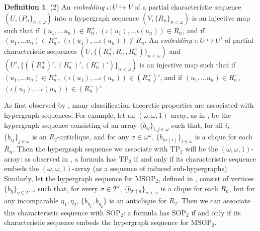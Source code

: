 \documentclass{amsart}
\theoremstyle{definition}
\newtheorem{definition}[theorem]{Definition}
\theoremstyle{remark}
\numberwithin{equation}{section}
\begin{document}
\begin{tcolorbox}
\begin{definition}
(2) An \textit{embedding} $\iota: U \hookrightarrow V$ of a partial characteristic sequence $(U, \{P_{n}\}_{n < \omega})$ into a hypergraph sequence $(V,\{R_{n}\}_{n < \omega})$ is an injective map such that if $(u_{1}, \ldots u_{n}) \in R^{+}_{n} $, $(\iota(u_{1}), \ldots \iota(u_{n})) \in R_{n} $, and if $(u_{1}, \ldots u_{n}) \in R^{-}_{n} $, $(\iota(u_{1}), \ldots \iota(u_{n})) \notin R_{n} $. An \textit{embedding} $\iota: U \hookrightarrow U'$ of partial characteristic sequences $(U, \{( R^{+}_{n} ,R_{n}^{-} ,R_{n}^{\sim})\}_{n < \omega})$ and $(U', \{( (R^{+}_{n})' ,(R_{n}^{-} )',(R_{n}^{\sim})')\}_{n < \omega})$ is an injective map such that if $(u_{1}, \ldots u_{n}) \in R^{+}_{n} $, $(\iota(u_{1}), \ldots \iota(u_{n})) \in (R^{+}_{n})' $, and if $(u_{1}, \ldots u_{n}) \in R^{-}_{n} $, $(\iota(u_{1}), \ldots \iota(u_{n})) \in (R^{-}_{n})' $

    
\end{definition}

\: As first observed by \cite{Mal10}, many classification-theoretic properties are associated with hypergraph sequences. For example, let an $(\omega, \omega, 1)$-array, as in \cite{Mal10}, be the hypergraph sequence consisting of an array $\{b_{ij}\}_{i, j \in \omega}$ such that, for all $i$, $\{b_{ij}\}_{j \in \omega}$ is an $R_{2}$-anticlique, and for any $\sigma \in \omega^{\omega}$, $\{ b_{i\sigma(i)}\}_{i \in \omega}$ is a clique for each $R_{n}$. Then the hypergraph sequence we associate with $\mathrm{TP}_{2}$ will be the $(\omega, \omega, 1)$-array: as observed in \cite{Mal10}, a formula has $\mathrm{TP}_{2}$ if and only if its characteristic sequence embeds the $(\omega, \omega, 1)$-array (as a sequence of induced sub-hypergraphs). Similarly, let the hypergraph sequence for $\mathrm{MSOP}_{2}$, defined in \cite{INDNSOP3}, consist of vertices $\{b_{\eta}\}_{\eta \in 2^{<\omega}}$ such that, for every $\sigma \in 2^{\omega}$, $\{ b_{\sigma \upharpoonleft n}\}_{n < \omega}$ is a clique for each $R_{n}$, but for any incomparable $\eta_{1}, \eta_{2}$, $\{b_{\eta_{1}},  b_{\eta_{2} }\}$ is an anticlique for $R_{2}$. Then we can associate this characteristic sequence with $\mathrm{SOP}_{2}$: a formula has $\mathrm{SOP}_{2}$ if and only if its characteristic sequence embeds the hypergraph sequence for $\mathrm{MSOP}_{2}$.



\end{tcolorbox}
\end{document}
